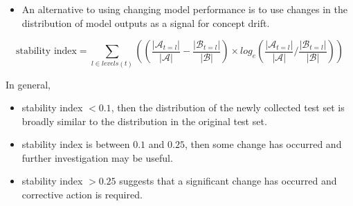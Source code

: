 \documentclass[xcolor={table}]{beamer}
\begin{document}
 \begin{frame} 
  \begin{itemize}
 	\item An alternative to using changing model performance is to use changes in the distribution of model outputs as a signal for concept drift.
\end{itemize}
\begin{footnotesize}
\begin{equation}
\text{stability index}=\sum_{l\in levels(t)} \left(\left(\frac{|\mathcal{A}_{t=l}|}{|\mathcal{A}|} - \frac{|\mathcal{B}_{t=l}|}{|\mathcal{B}|}\right) \times log_e\left(\displaystyle \frac{|\mathcal{A}_{t=l}|}{|\mathcal{A}|} / \frac{|\mathcal{B}_{t=l}|}{|\mathcal{B}|}\right)\right)
\label{eq:stabilityIndex}
\end{equation}
\end{footnotesize}
\end{frame} 

\begin{frame}
In general,
\begin{itemize}
	\item stability index $<0.1$, then the distribution of the newly collected test set is broadly similar to the distribution in the original test set.
	\item stability index is between $0.1$ and $0.25$, then some change has occurred and further investigation may be useful.
	\item stability index $>0.25$ suggests that a significant change has occurred and corrective action is required. 
\end{itemize}
\end{frame}
\end{document}
